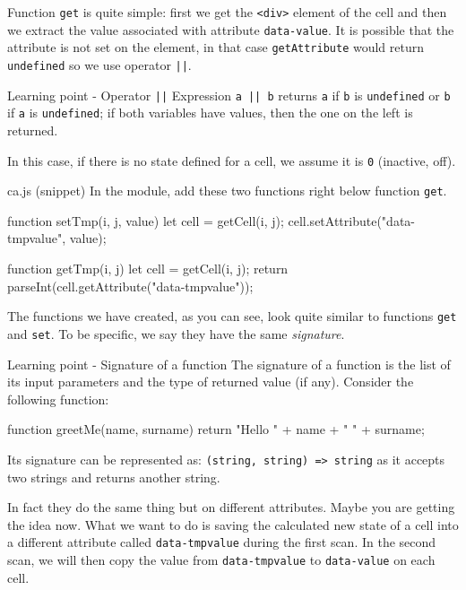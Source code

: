 Function \texttt{get} is quite simple: first we get the \texttt{<div>} element of the cell and then we
extract the value associated with attribute \texttt{data-value}. It is possible that the attribute
is not set on the element, in that case \texttt{getAttribute} would return \texttt{undefined} so we
use operator \texttt{||}.

\begin{tips}{Learning point - Operator \texttt{||}}
Expression \texttt{a || b} returns \texttt{a} if \texttt{b} is \texttt{undefined}
or \texttt{b} if \texttt{a} is \texttt{undefined}; if both variables have values, then the one on the
left is returned.
\end{tips}

In this case, if there is no state defined for a cell, we assume it is \texttt{0}
(inactive, off).

\begin{programcode}{ca.js (snippet)}
In the module, add these two functions right below function \texttt{get}.
\begin{code}
function setTmp(i, j, value) {
  let cell = getCell(i, j);
  cell.setAttribute("data-tmpvalue", value);
}

function getTmp(i, j) {
  let cell = getCell(i, j);
  return parseInt(cell.getAttribute("data-tmpvalue"));
}
\end{code}
\end{programcode}

The functions we have created, as you can see, look quite similar to functions
\texttt{get} and \texttt{set}. To be specific, we say they have the same
\textit{signature}.

\begin{tips}{Learning point - Signature of a function}
The signature of a function is the list of its input parameters and the type of returned
value (if any). Consider the following function:
\begin{code}
function greetMe(name, surname) {
  return "Hello " + name + " " + surname;
}
\end{code}
Its signature can be represented as: \texttt{(string, string) => string} as it accepts
two strings and returns another string.
\end{tips}

In fact they do the same thing but on different attributes. Maybe you are getting the
idea now. What we want to do is saving the calculated new state of a cell into a
different attribute called \texttt{data-tmpvalue} during the first scan. In the second scan,
we will then copy the value from \texttt{data-tmpvalue} to \texttt{data-value} on
each cell.


